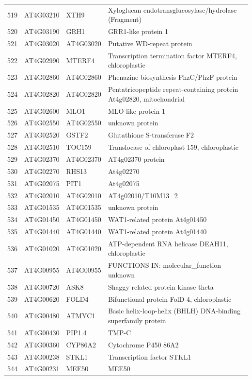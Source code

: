 \documentclass[11pt]{article}
\begin{document}
\begin{center}
\begin{tabular}{rlll}
519 & AT4G03210 & XTH9 & Xyloglucan endotransglucosylase/hydrolase (Fragment)\\
520 & AT4G03190 & GRH1 & GRR1-like protein 1\\
521 & AT4G03020 & AT4G03020 & Putative WD-repeat protein\\
522 & AT4G02990 & MTERF4 & Transcription termination factor MTERF4, chloroplastic\\
523 & AT4G02860 & AT4G02860 & Phenazine biosynthesis PhzC/PhzF protein\\
524 & AT4G02820 & AT4G02820 & Pentatricopeptide repeat-containing protein At4g02820, mitochondrial\\
525 & AT4G02600 & MLO1 & MLO-like protein 1\\
526 & AT4G02550 & AT4G02550 & unknown protein\\
527 & AT4G02520 & GSTF2 & Glutathione S-transferase F2\\
528 & AT4G02510 & TOC159 & Translocase of chloroplast 159, chloroplastic\\
529 & AT4G02370 & AT4G02370 & AT4g02370 protein\\
530 & AT4G02270 & RHS13 & At4g02270\\
531 & AT4G02075 & PIT1 & At4g02075\\
532 & AT4G02010 & AT4G02010 & AT4g02010/T10M13\_2\\
533 & AT4G01535 & AT4G01535 & unknown protein\\
534 & AT4G01450 & AT4G01450 & WAT1-related protein At4g01450\\
535 & AT4G01440 & AT4G01440 & WAT1-related protein At4g01440\\
536 & AT4G01020 & AT4G01020 & ATP-dependent RNA helicase DEAH11, chloroplastic\\
537 & AT4G00955 & AT4G00955 & FUNCTIONS IN: molecular\_function unknown\\
538 & AT4G00720 & ASK8 & Shaggy related protein kinase theta\\
539 & AT4G00620 & FOLD4 & Bifunctional protein FolD 4, chloroplastic\\
540 & AT4G00480 & ATMYC1 & Basic helix-loop-helix (BHLH) DNA-binding superfamily protein\\
541 & AT4G00430 & PIP1.4 & TMP-C\\
542 & AT4G00360 & CYP86A2 & Cytochrome P450 86A2\\
543 & AT4G00238 & STKL1 & Transcription factor STKL1\\
544 & AT4G00231 & MEE50 & MEE50\\

\end{tabular}
\end{center}
\end{document}
